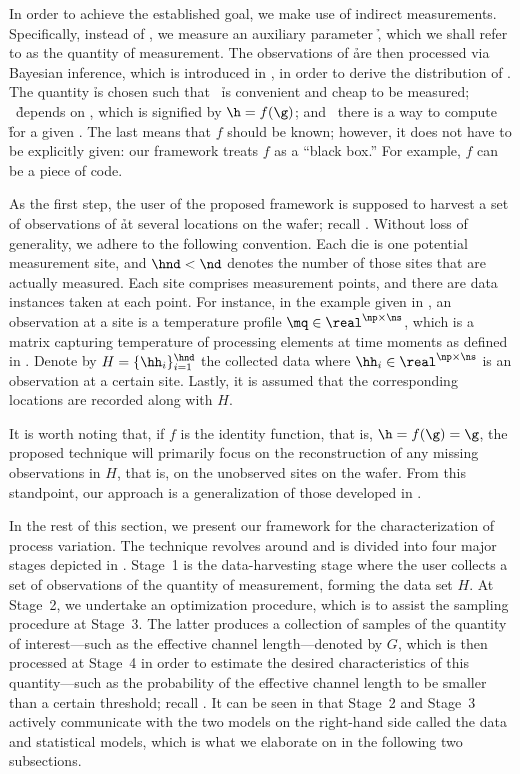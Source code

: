 In order to achieve the established goal, we make use of indirect measurements.
Specifically, instead of \g, we measure an auxiliary parameter \h, which we
shall refer to as the quantity of measurement. The observations of \h are then
processed via Bayesian inference, which is introduced in
, in order to derive the distribution of \g. The
quantity \h is chosen such that \one~\h is convenient and cheap to be measured;
\two~\h depends on \g, which is signified by $\h = f(\g)$; and \three~there is a
way to compute \h for a given \g. The last means that $f$ should be known;
however, it does not have to be explicitly given: our framework treats $f$ as a
``black box.'' For example, $f$ can be a piece of code.

As the first step, the user of the proposed framework is supposed to harvest a
set of observations of \h at several locations on the wafer; recall
. Without loss of generality, we adhere to the following
convention. Each die is one potential measurement site, and $\hnd < \nd$ denotes
the number of those sites that are actually measured. Each site comprises \np
measurement points, and there are \ns data instances taken at each point. For
instance, in the example given in , an observation at a
site is a temperature profile $\mq \in \real^{\np \times \ns}$, which is a
matrix capturing temperature of \np processing elements at \ns time moments as
defined in . Denote by $H = \{ \hh_i \}_{i =
1}^{\hnd}$ the collected data where $\hh_i \in \real^{\np \times \ns}$ is an
observation at a certain site. Lastly, it is assumed that the corresponding
locations are recorded along with $H$.

It is worth noting that, if $f$ is the identity function, that is, $\h = f(\g) =
\g$, the proposed technique will primarily focus on the reconstruction of any
missing observations in $H$, that is, on the unobserved sites on the wafer. From
this standpoint, our approach is a generalization of those developed in
\cite{zhang2010, reda2009}.

In the rest of this section, we present our framework for the characterization
of process variation. The technique revolves around  and is
divided into four major stages depicted in . Stage~1 is
the data-harvesting stage where the user collects a set of observations of the
quantity of measurement, forming the data set $H$. At Stage~2, we undertake an
optimization procedure, which is to assist the sampling procedure at Stage~3.
The latter produces a collection of samples of the quantity of interest---such
as the effective channel length---denoted by $G$, which is then processed at
Stage~4 in order to estimate the desired characteristics of this quantity---such
as the probability of the effective channel length to be smaller than a certain
threshold; recall . It can be seen in
 that Stage~2 and Stage~3 actively communicate with the
two models on the right-hand side called the data and statistical models, which
is what we elaborate on in the following two subsections.

